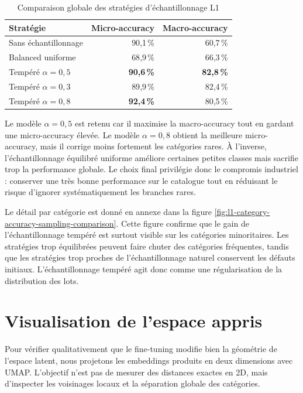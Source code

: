 \documentclass[12pt,a4paper]{report}
\begin{document}
\begin{table}[H]
    \centering
    \caption{Comparaison globale des stratégies d'échantillonnage L1}
    \label{tab:l1-sampling-results}
    \begin{tabular}{lrr}
        \toprule
        \textbf{Stratégie} & \textbf{Micro-accuracy} & \textbf{Macro-accuracy} \\
        \midrule
        Sans échantillonnage & 90{,}1\,\% & 60{,}7\,\% \\
        Balanced uniforme & 68{,}9\,\% & 66{,}3\,\% \\
        Tempéré $\alpha=0{,}5$ & \textbf{90{,}6\,\%} & \textbf{82{,}8\,\%} \\
        Tempéré $\alpha=0{,}3$ & 89{,}9\,\% & 82{,}4\,\% \\
        Tempéré $\alpha=0{,}8$ & \textbf{92{,}4\,\%} & 80{,}5\,\% \\
        \bottomrule
    \end{tabular}
\end{table}

Le modèle $\alpha=0{,}5$ est retenu car il maximise la macro-accuracy tout en gardant une micro-accuracy élevée. Le modèle $\alpha=0{,}8$ obtient la meilleure micro-accuracy, mais il corrige moins fortement les catégories rares. À l'inverse, l'échantillonnage équilibré uniforme améliore certaines petites classes mais sacrifie trop la performance globale. Le choix final privilégie donc le compromis industriel : conserver une très bonne performance sur le catalogue tout en réduisant le risque d'ignorer systématiquement les branches rares.

Le détail par catégorie est donné en annexe dans la figure \ref{fig:l1-category-accuracy-sampling-comparison}. Cette figure confirme que le gain de l'échantillonnage tempéré est surtout visible sur les catégories minoritaires. Les stratégies trop équilibrées peuvent faire chuter des catégories fréquentes, tandis que les stratégies trop proches de l'échantillonnage naturel conservent les défauts initiaux. L'échantillonnage tempéré agit donc comme une régularisation de la distribution des lots.

\section{Visualisation de l'espace appris}
\label{sec:l1-umap-main}

Pour vérifier qualitativement que le fine-tuning modifie bien la géométrie de l'espace latent, nous projetons les embeddings produits en deux dimensions avec UMAP. L'objectif n'est pas de mesurer des distances exactes en 2D, mais d'inspecter les voisinages locaux et la séparation globale des catégories.
\end{document}
